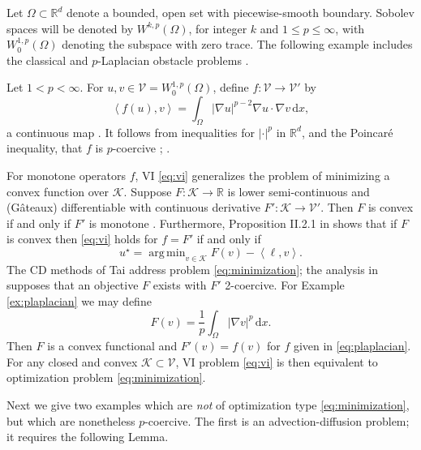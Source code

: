 \documentclass[review,hidelinks,onefignum,onetabnum]{siamart220329}
\newcommand{\RR}{\mathbb{R}}
\newcommand{\grad}{\nabla}
\newcommand{\cK}{\mathcal{K}}
\newcommand{\cV}{\mathcal{V}}
\newcommand{\ip}[2]{\left<#1,#2\right>}
\newcommand{\dx}{\, \mathrm{d}x}
\DeclareMathOperator*{\argmin}{arg\,min}
\begin{document}
Let $\Omega \subset \RR^d$ denote a bounded, open set with piecewise-smooth boundary.  Sobolev spaces \cite{Evans2010} will be denoted by $W^{k,p}(\Omega)$, for integer $k$ and $1\le p \le \infty$, with $W^{1,p}_0(\Omega)$ denoting the subspace with zero trace.  The following example includes the classical and $p$-Laplacian obstacle problems \cite{ChoeLewis1991}.

\begin{example}  \label{ex:plaplacian}  Let $1<p<\infty$.  For $u,v \in \cV = W^{1,p}_0(\Omega)$, define $f:\cV \to \cV'$ by
\begin{equation}
\ip{f(u)}{v} = \int_\Omega |\grad u|^{p-2} \grad u \cdot \grad v\dx, \label{eq:plaplacian}
\end{equation}
a continuous map \cite[Theorem A.0.6]{Peral1997}.  It follows from inequalities for $|\cdot|^p$ in $\RR^d$, and the Poincar\'e inequality, that $f$ is $p$-coercive \cite{ChoeLewis1991}; \cite[Appendix A]{Bueler2021conservation}.  \end{example}

For monotone operators $f$, VI \eqref{eq:vi} generalizes the problem of minimizing a convex function over $\cK$.  Suppose $F:\cK \to \RR$ is lower semi-continuous and (G\^ateaux) differentiable with continuous derivative $F':\cK \to \cV'$.  Then $F$ is convex if and only if $F'$ is monotone \cite[Proposition I.5.5]{EkelandTemam1976}.  Furthermore, Proposition II.2.1 in \cite{EkelandTemam1976} shows that if $F$ is convex then \eqref{eq:vi} holds for $f=F'$ if and only if
\begin{equation}
u^\star = \argmin_{v\in\cK} F(v) - \ip{\ell}{v}. \label{eq:minimization}
\end{equation}
The CD methods of Tai \cite{Tai2003} address problem \eqref{eq:minimization}; the analysis in \cite{Tai2003} supposes that an objective $F$ exists with $F'$ 2-coercive.  For Example \ref{ex:plaplacian} we may define
\begin{equation}
F(v) = \frac{1}{p} \int_\Omega |\grad v|^p\dx. \label{eq:plaplacianobjective}
\end{equation}
Then $F$ is a convex functional and $F'(v) = f(v)$ for $f$ given in \eqref{eq:plaplacian}.  For any closed and convex $\cK\subset \cV$, VI problem \eqref{eq:vi} is then equivalent to optimization problem \eqref{eq:minimization}.

Next we give two examples which are \emph{not} of optimization type \eqref{eq:minimization}, but which are nonetheless $p$-coercive.  The first is an advection-diffusion problem; it requires the following Lemma.
\end{document}

